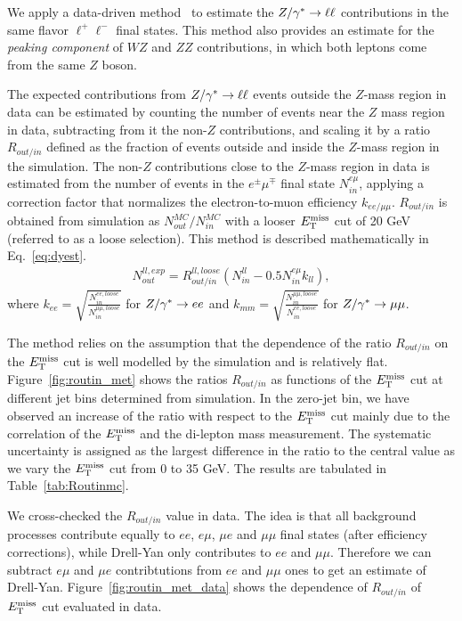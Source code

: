 We apply a data-driven method~\cite{dyestnote} to estimate the $Z/\gamma^*\to\ell\ell$ contributions in the 
same flavor $\ell^+\ell^-$ final states. This method also provides an estimate 
for the \emph{peaking component} of $WZ$ and $ZZ$ contributions, in which both 
leptons come from the same $Z$ boson.

The expected contributions from $Z/\gamma^*\to\ell\ell$ events outside the $Z$-mass 
region in data can be estimated by counting the number of events near 
the $Z$ mass region in data, subtracting from it the non-$Z$ contributions, 
and scaling it by a ratio $R_{out/in}$ defined as the fraction of events outside and 
inside the $Z$-mass region in the simulation. The non-$Z$ contributions close to the 
$Z$-mass region in data is estimated from the number of events in the $e^\pm\mu^\mp$ final state 
$N_{in}^{e\mu}$, applying a correction factor that normalizes the 
electron-to-muon efficiency $k_{ee/\mu\mu}$. $R_{out/in}$ is obtained from simulation as 
$N_{out}^{MC}/N_{in}^{MC}$ with a looser $E_\mathrm{T}^{\mathrm{miss}}$ cut of 20 GeV (referred to as a loose selection). 
This method is described mathematically in Eq.~\ref{eq:dyest}. 
\begin{eqnarray}
N_{out}^{ll,exp} = R_{out/in}^{ll,loose}(N_{in}^{ll} - 0.5N_{in}^{e\mu}k_{ll}), 
\label{eq:dyest}
\end{eqnarray}
where $k_{ee} = \sqrt{\frac{N_{in}^{ee,loose}}{N_{in}^{\mu\mu,loose}}}$ for 
$Z/\gamma^*\to ee$ and $k_{mm} = \sqrt{\frac{N_{in}^{\mu\mu,loose}}{N_{in}^{ee,loose}}}$ 
for $Z/\gamma^*\to\mu\mu$. 

The method relies on the assumption that the dependence of the ratio $R_{out/in}$ 
on the $E_\mathrm{T}^{\mathrm{miss}}$ cut is well modelled by the simulation and is relatively flat. 
Figure~\ref{fig:routin_met} shows the ratios $R_{out/in}$ as functions of 
the $E_\mathrm{T}^{\mathrm{miss}}$ cut at different jet bins determined from simulation.  
In the zero-jet bin, we have observed an increase of the 
ratio with respect to the $E_\mathrm{T}^{\mathrm{miss}}$ cut mainly due to the correlation of the 
$E_\mathrm{T}^{\mathrm{miss}}$ and the di-lepton mass measurement. The systematic uncertainty is assigned as the 
largest difference in the ratio to the central value as we vary the $E_\mathrm{T}^{\mathrm{miss}}$ cut from 
0 to 35 GeV. The results are tabulated in Table~\ref{tab:Routinmc}. 

We cross-checked the $R_{out/in}$ value in data. The idea is that all
background processes contribute equally to $ee$, $e\mu$, $\mu e$ and
$\mu\mu$ final states (after efficiency corrections), while Drell-Yan
only contributes to $ee$ and $\mu\mu$. Therefore we can subtract
$e\mu$ and $\mu e$ contribtutions from $ee$ and $\mu\mu$ ones to get
an estimate of Drell-Yan.  
Figure~\ref{fig:routin_met_data} shows the dependence of $R_{out/in}$ of $E_\mathrm{T}^{\mathrm{miss}}$ cut evaluated 
in data. 


